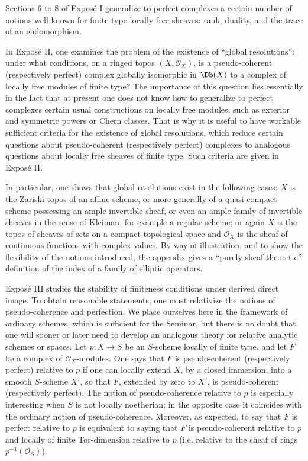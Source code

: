 Sections 6 to 8 of Exposé I generalize to perfect complexes a certain number of notions well known for finite-type locally free sheaves: rank, duality, and the trace of an endomorphism.

In Exposé II, one examines the problem of the existence of ``global resolutions'': under what conditions, on a ringed topos \((X,\mathcal O_X)\), is a pseudo-coherent (respectively perfect) complex globally isomorphic in \(\Db(X)\) to a complex of locally free modules of finite type? The importance of this question lies essentially in the fact that at present one does not know how to generalize to perfect complexes certain usual constructions on locally free modules, such as exterior and symmetric powers or Chern classes. That is why it is useful to have workable sufficient criteria for the existence of global resolutions, which reduce certain questions about pseudo-coherent (respectively perfect) complexes to analogous questions about locally free sheaves of finite type. Such criteria are given in Exposé II.

In particular, one shows that global resolutions exist in the following cases: \(X\) is the Zariski topos of an affine scheme, or more generally of a quasi-compact scheme possessing an ample invertible sheaf, or even an ample family of invertible sheaves in the sense of Kleiman, for example a regular scheme; or again \(X\) is the topos of sheaves of sets on a compact topological space and \(\mathcal O_X\) is the sheaf of continuous functions with complex values. By way of illustration, and to show the flexibility of the notions introduced, the appendix gives a ``purely sheaf-theoretic'' definition of the index of a family of elliptic operators.

Exposé III studies the stability of finiteness conditions under derived direct image. To obtain reasonable statements, one must relativize the notions of pseudo-coherence and perfection. We place ourselves here in the framework of ordinary schemes, which is sufficient for the Seminar, but there is no doubt that one will sooner or later need to develop an analogous theory for relative analytic schemes or spaces. Let \(p:X\to S\) be an \(S\)-scheme locally of finite type, and let \(F\) be a complex of \(\mathcal O_X\)-modules. One says that \(F\) is pseudo-coherent (respectively perfect) relative to \(p\) if one can locally extend \(X\), by a closed immersion, into a smooth \(S\)-scheme \(X'\), so that \(F\), extended by zero to \(X'\), is pseudo-coherent (respectively perfect). The notion of pseudo-coherence relative to \(p\) is especially interesting when \(S\) is not locally noetherian; in the opposite case it coincides with the ordinary notion of pseudo-coherence. Moreover, as expected, to say that \(F\) is perfect relative to \(p\) is equivalent to saying that \(F\) is pseudo-coherent relative to \(p\) and locally of finite Tor-dimension relative to \(p\) (i.e. relative to the sheaf of rings \(p^{-1}(\mathcal O_S)\)).

